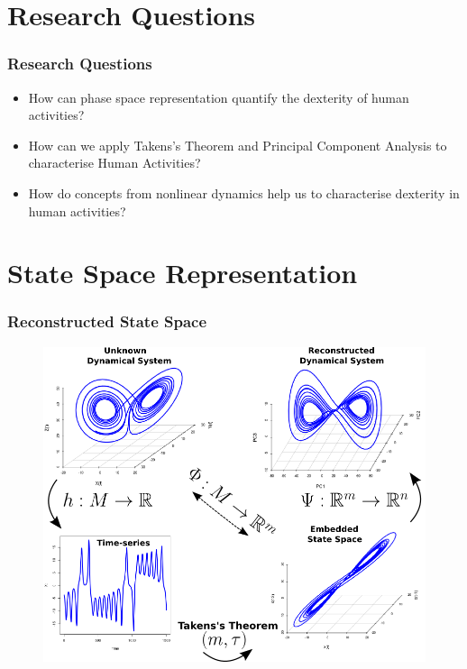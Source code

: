 \documentclass{beamer}
\begin{document}
\section{Research Questions}

\begin{frame}
	\frametitle{Research Questions}

    \begin{itemize}
    \item How can phase space representation quantify the dexterity 
          of human activities?
    \item How can we apply Takens's Theorem and Principal Component Analysis
	  to characterise Human Activities?
    \item How do concepts from nonlinear dynamics help us to 
	  characterise dexterity in human activities?
    \end{itemize}

\end{frame}


\section{State Space Representation}


\begin{frame}
\frametitle{Reconstructed State Space}
\vspace{-5mm}

\begin{figure}
\centering 
\includegraphics[scale=.35]{takens_theorem_v5} 
\end{figure}

\end{frame}
\end{document}
